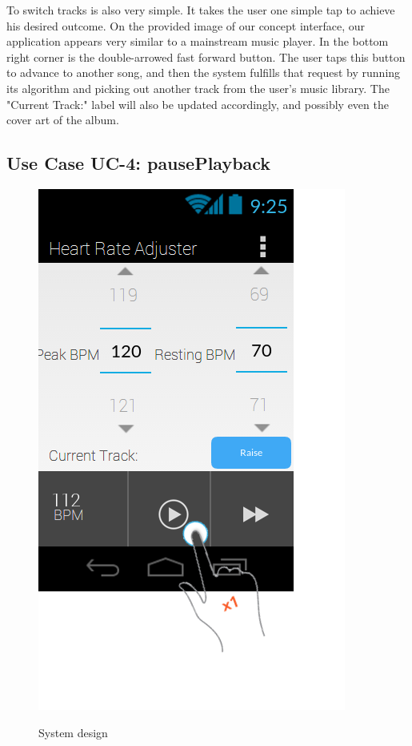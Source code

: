\documentclass[letterpaper,english, 12pt]{scrreprt}
\begin{document}
To switch tracks is also very simple. It takes the user one simple tap to achieve his desired outcome. On the provided image of our concept interface, our application appears very similar to a mainstream music player. In the bottom right corner is the double-arrowed fast forward button. The user taps this button to advance to another song, and then the system fulfills that request by running its algorithm and picking out another track from the user's music library. The "Current Track:" label will also be updated accordingly, and possibly even the cover art of the album.

\subsection{Use Case UC-4: pausePlayback}

\begin{figure}[H]
	\centering
	\includegraphics{img/Prelim_Design/PrelimDesign_3.png}\\
	\caption{System design}
\end{figure}
\end{document}
